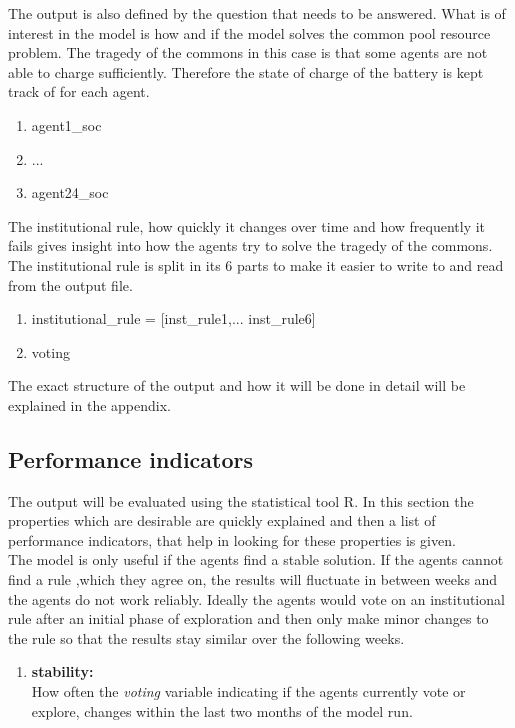\documentclass[a4paper]{article}
\begin{document}
The output is also  defined by the question that needs to be answered. What is of interest in the model is how and 
if the model solves the common pool resource problem. The tragedy of the commons in this case is that some agents are 
not able to charge sufficiently. Therefore the state of charge of the battery is kept track of for each agent.
\begin{enumerate}
 \item agent1\_soc
 \item ...
 \item agent24\_soc
\end{enumerate}

The institutional rule, how quickly it changes over time and how frequently it fails gives insight into how the 
agents try to solve the tragedy of the commons. The institutional rule is split in its 6 parts to make it easier to write
to and read from the output file. 
\begin{enumerate}
 \item institutional\_rule = [inst\_rule1,... inst\_rule6]
 \item voting
\end{enumerate}

The exact structure of the output and how it will be done in detail will be explained in the appendix.

\subsection{Performance indicators}
The output will be evaluated using the statistical tool R. In this section the properties which are desirable 
are quickly explained and then a list of performance indicators, that help in looking for these properties is given.\\
The model is only useful if the agents find a stable solution. If the agents cannot find a rule ,which they agree on,
the results will fluctuate in between weeks and the agents do not work reliably. Ideally the agents would vote on an 
institutional rule after an initial phase of exploration and then only make minor changes to the rule so that 
the results stay similar over the following weeks.\\
\begin{enumerate}
 \item \textbf{stability:}\\
 How often the \textit{voting} variable indicating if the agents currently vote or explore, changes within the last 
 two months of the model run. 
\end{enumerate}
\end{document}
